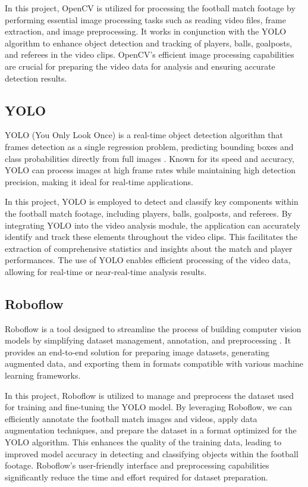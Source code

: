 \documentclass{article}
\begin{document}
\noindent In this project, OpenCV is utilized for processing the football match footage by performing essential image processing tasks such as reading video files, frame extraction, and image preprocessing. It works in conjunction with the YOLO algorithm to enhance object detection and tracking of players, balls, goalposts, and referees in the video clips. OpenCV's efficient image processing capabilities are crucial for preparing the video data for analysis and ensuring accurate detection results.

\subsection{YOLO}

YOLO (You Only Look Once) is a real-time object detection algorithm that frames detection as a single regression problem, predicting bounding boxes and class probabilities directly from full images \cite{Yolo}. Known for its speed and accuracy, YOLO can process images at high frame rates while maintaining high detection precision, making it ideal for real-time applications.\vspace{0.5em}

\noindent In this project, YOLO is employed to detect and classify key components within the football match footage, including players, balls, goalposts, and referees. By integrating YOLO into the video analysis module, the application can accurately identify and track these elements throughout the video clips. This facilitates the extraction of comprehensive statistics and insights about the match and player performances. The use of YOLO enables efficient processing of the video data, allowing for real-time or near-real-time analysis results.

\subsection{Roboflow}

Roboflow is a tool designed to streamline the process of building computer vision models by simplifying dataset management, annotation, and preprocessing \cite{Roboflow}. It provides an end-to-end solution for preparing image datasets, generating augmented data, and exporting them in formats compatible with various machine learning frameworks.\vspace{0.5em}

\noindent In this project, Roboflow is utilized to manage and preprocess the dataset used for training and fine-tuning the YOLO model. By leveraging Roboflow, we can efficiently annotate the football match images and videos, apply data augmentation techniques, and prepare the dataset in a format optimized for the YOLO algorithm. This enhances the quality of the training data, leading to improved model accuracy in detecting and classifying objects within the football footage. Roboflow's user-friendly interface and preprocessing capabilities significantly reduce the time and effort required for dataset preparation.
\end{document}
